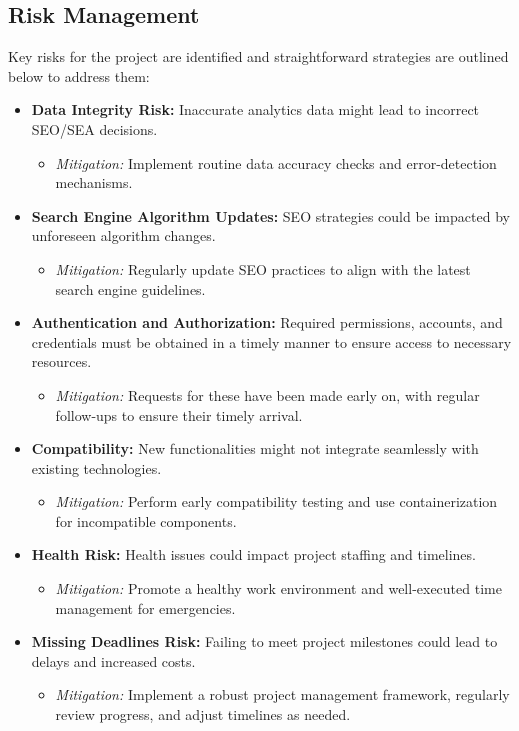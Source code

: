 \documentclass[12pt,a4paper]{article}
\begin{document}
\subsection{Risk Management}

Key risks for the project are identified and straightforward strategies are outlined below to address them:

\begin{itemize}
    \item \textbf{Data Integrity Risk:} Inaccurate analytics data might lead to incorrect SEO/SEA decisions.
    \begin{itemize}
        \item \textit{Mitigation:} Implement routine data accuracy checks and error-detection mechanisms.
    \end{itemize}

    \item \textbf{Search Engine Algorithm Updates:} SEO strategies could be impacted by unforeseen algorithm changes.
    \begin{itemize}
        \item \textit{Mitigation:} Regularly update SEO practices to align with the latest search engine guidelines.
    \end{itemize}

    \item \textbf{Authentication and Authorization:} Required permissions, accounts, and credentials must be obtained in a timely manner to ensure access to necessary resources. 
    \begin{itemize}
        \item \textit{Mitigation:} Requests for these have been made early on, with regular follow-ups to ensure their timely arrival.
    \end{itemize}

    \item \textbf{Compatibility:} New functionalities might not integrate seamlessly with existing technologies.
    \begin{itemize}
        \item \textit{Mitigation:} Perform early compatibility testing and use containerization for incompatible components.
    \end{itemize}

    \item \textbf{Health Risk:} Health issues could impact project staffing and timelines.
    \begin{itemize}
        \item \textit{Mitigation:} Promote a healthy work environment and well-executed time management for emergencies.
    \end{itemize}

    \item \textbf{Missing Deadlines Risk:} Failing to meet project milestones could lead to delays and increased costs.
    \begin{itemize}
        \item \textit{Mitigation:} Implement a robust project management framework, regularly review progress, and adjust timelines as needed.
    \end{itemize}
\end{itemize}
\end{document}
